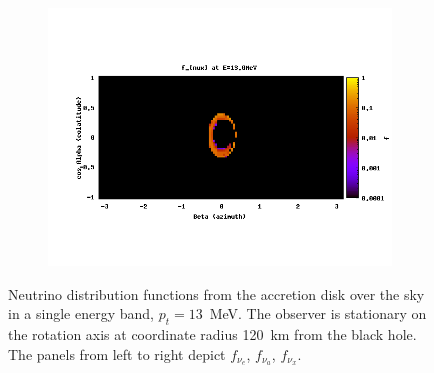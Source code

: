 \begin{figure}
\begin{subfigure}{.3\textwidth}
    \centering
    \includegraphics[width=1\linewidth]{Figures/f_nux-A-13MeV}
  \end{subfigure}
  \caption[$f_\nu$ for the disk, from the rotation axis: sky map at average energy]{
    Neutrino distribution functions from the accretion disk over the sky in a
    single energy band, $p_t=13$~MeV. The observer is stationary on the rotation
    axis at coordinate radius 120~km from the black hole. The panels from
    left to right depict $f_{\nu_e}$, $f_{\nu_a}$, $f_{\nu_x}$.
  }
  \label{fig:f_disk_axis_13MeV}
\end{figure}

